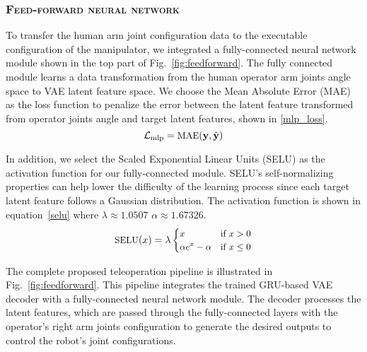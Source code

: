 \vspace{-4mm}

\subsubsection{\textbf{\textsc{Feed-forward neural network}}} To transfer the human arm joint configuration data to the executable configuration of the manipulator, we integrated a fully-connected neural network module shown in the top part of Fig.~\ref{fig:feedforward}. The fully connected module learns a data transformation from the human operator arm joints angle space to VAE latent feature space. We choose the Mean Absolute Error (MAE) as the loss function to penalize the error between the latent feature transformed from operator joints angle and target latent features, shown in \ref{mlp_loss}.
\vspace{-7pt}
\begin{equation}\label{mlp_loss}
\vspace{-6pt}
\mathcal{L}_{\text{mlp}} = \small\text{MAE}(\mathbf{y}, \hat{\mathbf{y}})
\end{equation}

In addition, we select the Scaled Exponential Linear Units (SELU) as the activation function for our fully-connected module. SELU's self-normalizing properties can help lower the difficulty of the learning process since each target latent feature follows a Gaussian distribution. The activation function is shown in equation~\ref{selu} where $\lambda \approx 1.0507$  $\alpha \approx 1.67326$.
\vspace{-8pt}
\begin{equation}\label{selu}
    \small\text{SELU}(x) = \lambda \begin{cases} 
    x & \text{if } x > 0 \\
    \alpha e^x - \alpha & \text{if } x \leq 0 
    \end{cases}
    \vspace{-5pt}
\end{equation}

The complete proposed teleoperation pipeline is illustrated in Fig.~\ref{fig:feedforward}. This pipeline integrates the trained GRU-based VAE decoder with a fully-connected neural network module. The decoder processes the latent features, which are passed through the fully-connected layers with the operator's right arm joints configuration to generate the desired outputs to control the robot's joint configurations.

